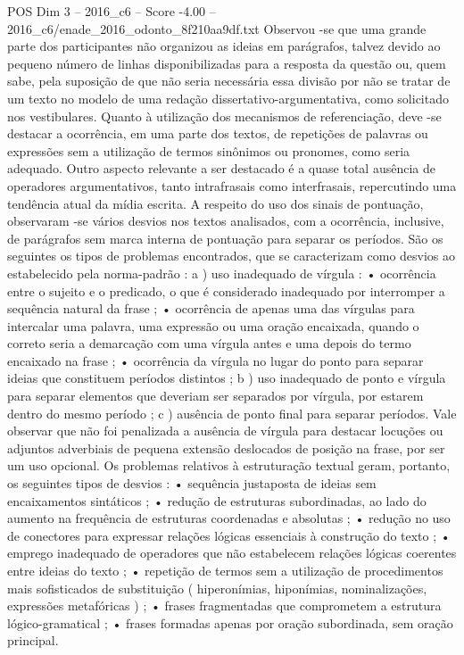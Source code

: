 \begin{textsample}{POS Dim 3 – 2016\_c6 – Score -4.00 – 2016\_c6/enade\_2016\_odonto\_8f210aa9df.txt}
Observou -se que uma grande parte dos participantes não organizou as ideias em parágrafos, talvez devido ao pequeno número de linhas disponibilizadas para a resposta da questão ou, quem sabe, pela suposição de que não seria necessária essa divisão por não se tratar de um texto no modelo de uma redação dissertativo-argumentativa, como solicitado nos vestibulares.
Quanto à utilização dos mecanismos de referenciação, deve -se destacar a ocorrência, em uma parte dos textos, de repetições de palavras ou expressões sem a utilização de termos sinônimos ou pronomes, como seria adequado.
Outro aspecto relevante a ser destacado é a quase total ausência de operadores argumentativos, tanto intrafrasais como interfrasais, repercutindo uma tendência atual da mídia escrita.
A respeito do uso dos sinais de pontuação, observaram -se vários desvios nos textos analisados, com a ocorrência, inclusive, de parágrafos sem marca interna de pontuação para separar os períodos.
São os seguintes os tipos de problemas encontrados, que se caracterizam como desvios ao estabelecido pela norma-padrão : a ) uso inadequado de vírgula : • ocorrência entre o sujeito e o predicado, o que é considerado inadequado por interromper a sequência natural da frase ; • ocorrência de apenas uma das vírgulas para intercalar uma palavra, uma expressão ou uma oração encaixada, quando o correto seria a demarcação com uma vírgula antes e uma depois do termo encaixado na frase ; • ocorrência da vírgula no lugar do ponto para separar ideias que constituem períodos distintos ; b ) uso inadequado de ponto e vírgula para separar elementos que deveriam ser separados por vírgula, por estarem dentro do mesmo período ; c ) ausência de ponto final para separar períodos.
Vale observar que não foi penalizada a ausência de vírgula para destacar locuções ou adjuntos adverbiais de pequena extensão deslocados de posição na frase, por ser um uso opcional.
Os problemas relativos à estruturação textual geram, portanto, os seguintes tipos de desvios : • sequência justaposta de ideias sem encaixamentos sintáticos ; • redução de estruturas subordinadas, ao lado do aumento na frequência de estruturas coordenadas e absolutas ; • redução no uso de conectores para expressar relações lógicas essenciais à construção do texto ; • emprego inadequado de operadores que não estabelecem relações lógicas coerentes entre ideias do texto ; • repetição de termos sem a utilização de procedimentos mais sofisticados de substituição ( hiperonímias, hiponímias, nominalizações, expressões metafóricas ) ; • frases fragmentadas que comprometem a estrutura lógico-gramatical ; • frases formadas apenas por oração subordinada, sem oração principal.

\end{textsample}
